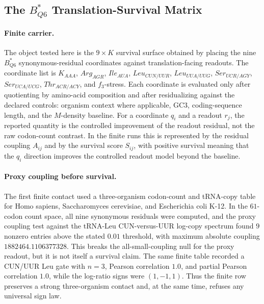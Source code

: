 \subsection{The $B^*_{Q6}$ Translation-Survival Matrix}
\label{sec:bioreality-b-star-q6-translation-survival-matrix}

\paragraph{Finite carrier.}
The object tested here is the $9\times K$ survival surface obtained by placing the nine $B^*_{Q6}$ synonymous-residual coordinates against translation-facing readouts.  The coordinate list is
$K_{AAA}$, $Arg_{AGR}$, $Ile_{AUA}$, $Leu_{CUN/UUR}$, $Leu_{UUA/UUG}$, $Ser_{UCR/AGY}$, $Ser_{UCA/UCG}$, $Thr_{ACR/ACY}$, and $f_3$-stress.  Each coordinate is evaluated only after quotienting by amino-acid composition and after residualizing against the declared controls: organism context where applicable, GC3, coding-sequence length, and the $M$-density baseline.  For a coordinate $q_i$ and a readout $r_j$, the reported quantity is the controlled improvement of the readout residual, not the raw codon-count contrast.  In the finite runs this is represented by the residual coupling $A_{ij}$ and by the survival score $S_{ij}$, with positive survival meaning that the $q_i$ direction improves the controlled readout model beyond the baseline.

\paragraph{Proxy coupling before survival.}
The first finite contact used a three-organism codon-count and tRNA-copy table for Homo sapiens, Saccharomyces cerevisiae, and Escherichia coli K-12.  In the $61$-codon count space, all nine synonymous residuals were computed, and the proxy coupling test against the tRNA-Leu CUN-versus-UUR log-copy spectrum found $9$ nonzero entries above the stated $0.01$ threshold, with maximum absolute coupling
$1882464.1106377328$.  This breaks the all-small-coupling null for the proxy readout, but it is not itself a survival claim.  The same finite table recorded a CUN/UUR Leu gate with $n=3$, Pearson correlation $1.0$, and partial Pearson correlation $1.0$, while the log-ratio signs were $(1,-1,1)$.  Thus the finite row preserves a strong three-organism contact and, at the same time, refuses any universal sign law.

